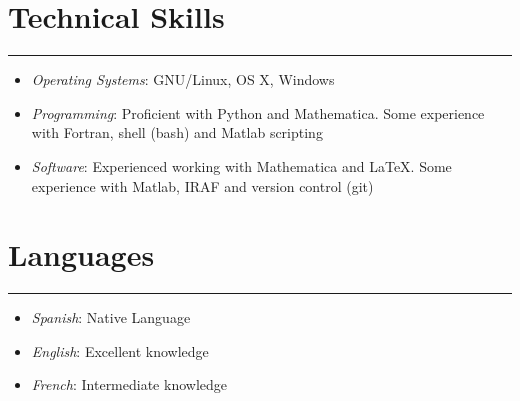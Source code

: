 \documentclass[letterpaper,10pt]{article}
\begin{document}
\section*{Technical Skills}
\hrule
\vspace{.3 cm}


  \begin{itemize}[label=$\blacktriangleright$]
  \item \emph{Operating Systems}: GNU/Linux, OS X, Windows
    \end{itemize}

\begin{itemize}[label=$\blacktriangleright$]
  \item \emph{Programming}: Proficient with Python and Mathematica. Some experience with Fortran, shell (bash) and  Matlab  scripting
  \end{itemize}
  

  \begin{itemize}[label=$\blacktriangleright$]
  \item \emph{Software}: Experienced working with Mathematica and \LaTeX. Some experience with Matlab, IRAF and version control (git)  
    \end{itemize}


\section*{Languages}
\hrule
\vspace{.3 cm}
\begin{itemize}[label=$\blacktriangleright$]
\item \emph{Spanish}: Native Language
\item \emph{English}: Excellent knowledge
\item \emph{French}: Intermediate knowledge
\end{itemize}
\end{document}
